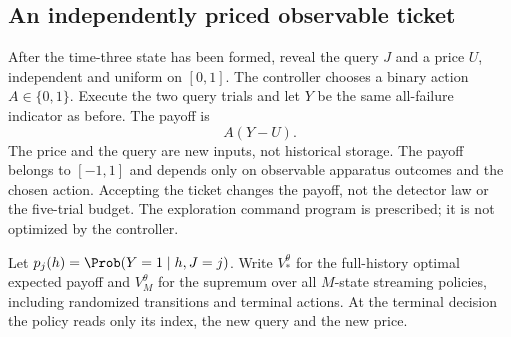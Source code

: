 \documentclass[11pt]{amsart}
\theoremstyle{definition}\newtheorem{definition}[theorem]{Definition}
\theoremstyle{remark}\newtheorem{remark}[theorem]{Remark}
\begin{document}
\subsection{An independently priced observable ticket}
After the time-three state has been formed, reveal the query $J$ and a
price $U$, independent and uniform on $[0,1]$. The controller chooses a
binary action $A\in\{0,1\}$. Execute the two query trials and let $Y$
be the same all-failure indicator as before. The payoff is
\begin{equation}\label{eq:ticket-payoff}
 A(Y-U).
\end{equation}
The price and the query are new inputs, not historical storage. The
payoff belongs to $[-1,1]$ and depends only on observable apparatus
outcomes and the chosen action. Accepting the ticket changes the payoff,
not the detector law or the five-trial budget. The exploration command
program is prescribed; it is not optimized by the controller.

Let $p_j(h)=\Prob(Y=1\mid h,J=j)$. Write $V_*^\theta$ for the
full-history optimal expected payoff and $V_M^\theta$ for the supremum
over all $M$-state streaming policies, including randomized transitions
and terminal actions. At the terminal decision the policy reads only its
index, the new query and the new price.
\end{document}
